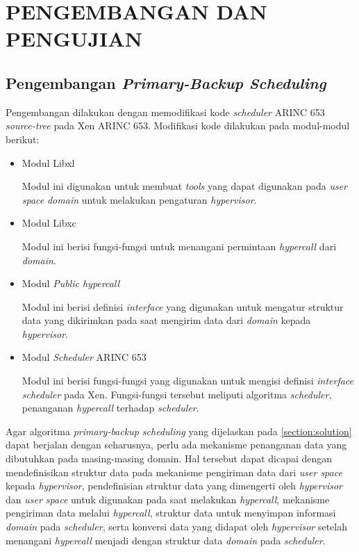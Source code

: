 \chapter{PENGEMBANGAN DAN PENGUJIAN}

\section{Pengembangan \textit{Primary-Backup Scheduling}}

Pengembangan dilakukan dengan memodifikasi kode \textit{scheduler} ARINC 653
\textit{source-tree} pada Xen ARINC 653.  Modifikasi kode dilakukan pada modul-modul berikut:

\begin{itemize}

	\item Modul Libxl

	Modul ini digunakan untuk membuat \textit{tools} yang dapat digunakan pada \textit{user
	space} \textit{domain}  untuk melakukan pengaturan \textit{hypervisor}.

	\item Modul Libxc

	Modul ini berisi fungsi-fungsi untuk menangani permintaan \textit{hypercall} dari
	\textit{domain}.

	\item Modul \textit{Public hypercall}

	Modul ini berisi definisi \textit{interface} yang digunakan untuk mengatur struktur data
	yang dikirimkan pada saat mengirim data dari \textit{domain} kepada \textit{hypervisor}.

	\item Modul \textit{Scheduler} ARINC 653

	Modul ini berisi fungsi-fungsi yang digunakan untuk mengisi definisi \textit{interface}
	\textit{scheduler} pada Xen. Fungsi-fungsi tersebut meliputi algoritma
	\textit{scheduler}, penanganan \textit{hypercall} terhadap \textit{scheduler}.

\end{itemize}

Agar algoritma \textit{primary-backup scheduling} yang dijelaskan pada
\autoref{section:solution} dapat berjalan dengan seharusnya, perlu ada mekanisme penanganan data
yang dibutuhkan pada masing-masing domain. Hal tersebut dapat dicapai dengan mendefinisikan
struktur data pada mekanisme pengiriman data dari \textit{user space} kepada
\textit{hypervisor}, pendefinisian struktur data yang dimengerti oleh \textit{hypervisor} dan
\textit{user space} untuk digunakan pada saat melakukan \textit{hypercall}, mekanisme pengiriman
data melalui \textit{hypercall}, struktur data untuk menyimpan informasi \textit{domain} pada
\textit{scheduler}, serta konversi data yang didapat oleh \textit{hypervisor} setelah menangani
\textit{hypercall} menjadi dengan struktur data \textit{domain} pada \textit{scheduler}.

